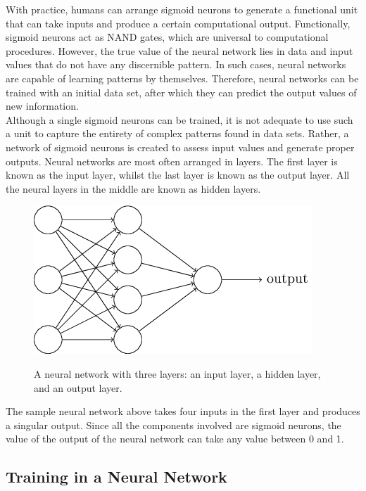 \documentclass[11pt]{article}
\begin{document}
With practice, humans can arrange sigmoid neurons to generate a functional unit that can take inputs and produce a certain computational output. Functionally, sigmoid neurons act as NAND gates, which are universal to computational procedures. However, the true value of the neural network lies in data and input values that do not have any discernible pattern. In such cases, neural networks are capable of learning patterns by themselves. Therefore, neural networks can be trained with an initial data set, after which they can predict the output values of new information. \\

Although a single sigmoid neurons can be trained, it is not adequate to use such a unit to capture the entirety of complex patterns found in data sets. Rather, a network of sigmoid neurons is created to assess input values and generate proper outputs. Neural networks are most often arranged in layers. The first layer is known as the input layer, whilst the last layer is known as the output layer. All the neural layers in the middle are known as hidden layers. \\

\begin{figure}[H]
    \centering
        \caption{A neural network with three layers: an input layer, a hidden layer, and an output layer.}
    \includegraphics[scale=0.75]{neuralNetwork.png}
    \label{fig:neuralNetwork}
\end{figure}

The sample neural network above takes four inputs in the first layer and produces a singular output. Since all the components involved are sigmoid neurons, the value of the output of the neural network can take any value between 0 and 1. 

\subsection{Training in a Neural Network}
\end{document}
